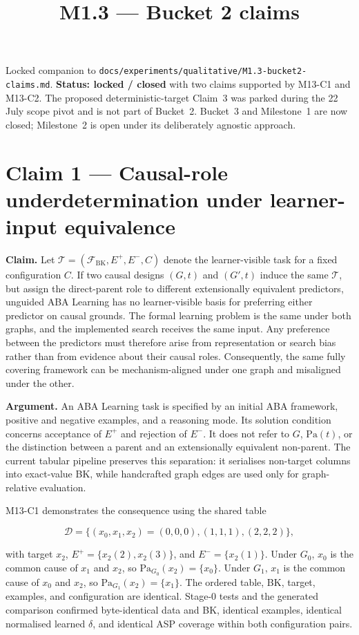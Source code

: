 \documentclass[11pt]{article}
\title{M1.3 --- Bucket 2 claims}
\author{}
\date{}
\begin{document}
\maketitle

Locked companion to \texttt{docs/experiments/qualitative/M1.3-bucket2-claims.md}. \textbf{Status: locked / closed} with two claims supported by M13-C1 and M13-C2. The proposed deterministic-target Claim~3 was parked during the 22 July scope pivot and is not part of Bucket~2. Bucket~3 and Milestone~1 are now closed; Milestone~2 is open under its deliberately agnostic approach.

\section{Claim 1 --- Causal-role underdetermination under learner-input equivalence}

\textbf{Claim.} Let \(\mathcal{T}=(\mathcal{F}_{\mathrm{BK}},E^+,E^-,C)\) denote the learner-visible task for a fixed configuration \(C\). If two causal designs \((G,t)\) and \((G',t)\) induce the same \(\mathcal{T}\), but assign the direct-parent role to different extensionally equivalent predictors, unguided ABA Learning has no learner-visible basis for preferring either predictor on causal grounds. The formal learning problem is the same under both graphs, and the implemented search receives the same input. Any preference between the predictors must therefore arise from representation or search bias rather than from evidence about their causal roles. Consequently, the same fully covering framework can be mechanism-aligned under one graph and misaligned under the other.

\textbf{Argument.} An ABA Learning task is specified by an initial ABA framework, positive and negative examples, and a reasoning mode. Its solution condition concerns acceptance of \(E^+\) and rejection of \(E^-\). It does not refer to \(G\), \(\mathrm{Pa}(t)\), or the distinction between a parent and an extensionally equivalent non-parent. The current tabular pipeline preserves this separation: it serialises non-target columns into exact-value BK, while handcrafted graph edges are used only for graph-relative evaluation.

M13-C1 demonstrates the consequence using the shared table

\[ \mathcal{D}=\{(x_0,x_1,x_2)=(0,0,0),(1,1,1),(2,2,2)\}, \]

with target \(x_2\), \(E^+=\{x_2(2),x_2(3)\}\), and \(E^-=\{x_2(1)\}\). Under \(G_0\), \(x_0\) is the common cause of \(x_1\) and \(x_2\), so \(\mathrm{Pa}_{G_0}(x_2)=\{x_0\}\). Under \(G_1\), \(x_1\) is the common cause of \(x_0\) and \(x_2\), so \(\mathrm{Pa}_{G_1}(x_2)=\{x_1\}\). The ordered table, BK, target, examples, and configuration are identical. Stage-0 tests and the generated comparison confirmed byte-identical data and BK, identical examples, identical normalised learned \(\delta\), and identical ASP coverage within both configuration pairs.
\end{document}
